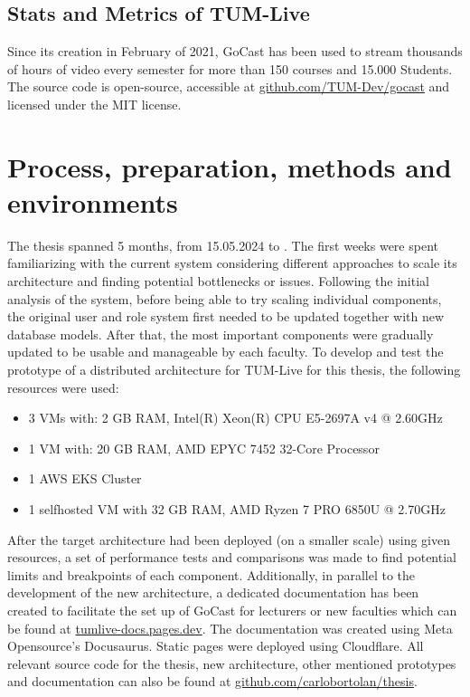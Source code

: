 \newpage

\subsection{Stats and Metrics of TUM-Live}

Since its creation in February of 2021, GoCast has been used to stream thousands of hours of video every semester for more than 150 courses and 15.000 Students. The source code is open-source, accessible at \href{https://github.com/TUM-Dev/gocast}{github.com/TUM-Dev/gocast} and licensed under the MIT license.

\section{Process, preparation, methods and environments}

The thesis spanned 5 months, from 15.05.2024 to \getSubmissionDate{}. The first weeks were spent familiarizing with the current system considering different approaches to scale its architecture and finding potential bottlenecks or issues. Following the initial analysis of the system, before being able to try scaling individual components, the original user and role system first needed to be updated together with new database models. After that, the most important components were gradually updated to be usable and manageable by each faculty. 
To develop and test the prototype of a distributed architecture for TUM-Live for this thesis, the following resources were used:
\begin{itemize}
    \item 3 \ac{VM}s with: 2 GB RAM, Intel(R) Xeon(R) CPU E5-2697A v4 @ 2.60GHz
    \item 1 \ac{VM} with: 20 GB RAM, AMD EPYC 7452 32-Core Processor
    \item 1 \ac{AWS} \ac{EKS} Cluster
    \item 1 selfhosted \ac{VM} with 32 GB RAM, AMD Ryzen 7 PRO 6850U @ 2.70GHz
\end{itemize}

After the target architecture had been deployed (on a smaller scale) using given resources, a set of performance tests and comparisons was made to find potential limits and breakpoints of each component. 
Additionally, in parallel to the development of the new architecture, a dedicated documentation has been created to facilitate the set up of GoCast for lecturers or new faculties which can be found at \href{https://tumlive-docs.pages.dev/}{tumlive-docs.pages.dev}. The documentation was created using Meta Opensource's Docusaurus. Static pages were deployed using Cloudflare.
All relevant source code for the thesis, new architecture, other mentioned prototypes and documentation can also be found at \href{https://github.com/carlobortolan/thesis}{github.com/carlobortolan/thesis}.

